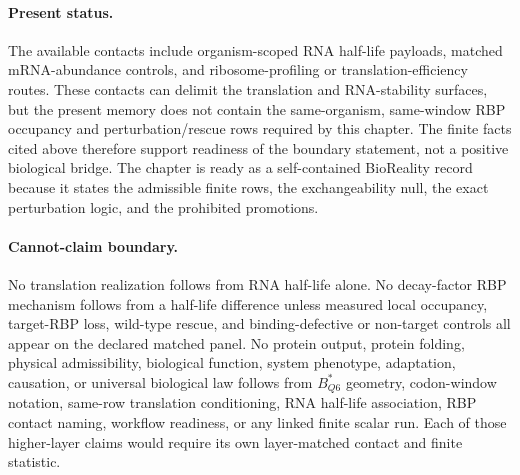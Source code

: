 \paragraph{Present status.}
The available contacts include organism-scoped RNA half-life payloads, matched mRNA-abundance controls, and ribosome-profiling or translation-efficiency routes.  These contacts can delimit the translation and RNA-stability surfaces, but the present memory does not contain the same-organism, same-window RBP occupancy and perturbation/rescue rows required by this chapter.  The finite facts cited above therefore support readiness of the boundary statement, not a positive biological bridge.  The chapter is ready as a self-contained BioReality record because it states the admissible finite rows, the exchangeability null, the exact perturbation logic, and the prohibited promotions.

\paragraph{Cannot-claim boundary.}
No translation realization follows from RNA half-life alone.  No decay-factor RBP mechanism follows from a half-life difference unless measured local occupancy, target-RBP loss, wild-type rescue, and binding-defective or non-target controls all appear on the declared matched panel.  No protein output, protein folding, physical admissibility, biological function, system phenotype, adaptation, causation, or universal biological law follows from $B^{\ast}_{Q6}$ geometry, codon-window notation, same-row translation conditioning, RNA half-life association, RBP contact naming, workflow readiness, or any linked finite scalar run.  Each of those higher-layer claims would require its own layer-matched contact and finite statistic.